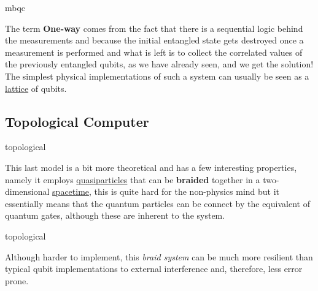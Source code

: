 \documentclass[aspectratio=43]{beamer}
\begin{document}
\begin{frameImg}[height]{mbqc}
    \begin{card}
        The term \textbf{One-way} comes from the fact that there is a sequential logic behind the measurements and because the initial entangled state gets destroyed once a measurement is performed and what is left is to collect the correlated values of the previously entangled qubits, as we have already seen, and we get the solution!\\
        The simplest physical implementations of such a system can usually be seen as a \href{https://en.wikipedia.org/wiki/Lattice_(group)}{lattice} of qubits.
    \end{card}
\pagenumber
\end{frameImg}


\subsection{Topological \q Computer}
\begin{frameImg}[height]{topological}
    \begin{card}
        This last model is a bit more theoretical and has a few interesting properties, namely it employs \href{https://en.wikipedia.org/wiki/Quasiparticle}{quasiparticles} that can be \textbf{braided} together in a two-dimensional  \href{https://en.wikipedia.org/wiki/Spacetime}{spacetime}, this is quite hard for the non-physics mind but it essentially means that the quantum particles can be connect by the equivalent of quantum gates, although these are inherent to the system. 
    \end{card}
\pagenumber
\end{frameImg}

\begin{frameImg}[height]{topological}
    \begin{card}
        Although harder to implement, this \textit{braid system} can be much more resilient than typical qubit implementations to external interference and, therefore, less error prone.
    \end{card}
\pagenumber
\end{frameImg}
\end{document}
